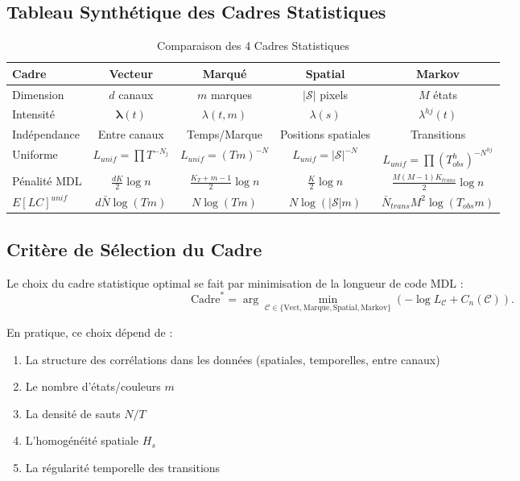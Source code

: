 \documentclass[11pt,a4paper]{article}
\begin{document}
	\subsection{Tableau Synthétique des Cadres Statistiques}
	\label{subsec:tableau_synthese}
	
	\begin{table}[h]
		\centering
		\caption{Comparaison des 4 Cadres Statistiques}
		\label{tab:cadres_stats}
		\begin{tabular}{|l|c|c|c|c|}
			\hline
			\textbf{Cadre} & \textbf{Vecteur} & \textbf{Marqué} & \textbf{Spatial} & \textbf{Markov} \\
			\hline
			Dimension & $d$ canaux & $m$ marques & $|\mathcal{S}|$ pixels & $M$ états \\
			\hline
			Intensité & $\boldsymbol{\lambda}(t)$ & $\lambda(t,m)$ & $\lambda(s)$ & $\lambda^{hj}(t)$ \\
			\hline
			Indépendance & Entre canaux & Temps/Marque & Positions spatiales & Transitions \\
			\hline
			Uniforme & $L_{unif} = \prod T^{-N_j}$ & $L_{unif} = (Tm)^{-N}$ & $L_{unif} = |\mathcal{S}|^{-N}$ & $L_{unif} = \prod (T_{obs}^h)^{-N^{hj}}$ \\
			\hline
			Pénalité MDL & $\frac{dK}{2}\log n$ & $\frac{K_T+m-1}{2}\log n$ & $\frac{K}{2}\log n$ & $\frac{M(M-1)K_{trans}}{2}\log n$ \\
			\hline
			$E[LC]^{unif}$ & $d\bar{N}\log(Tm)$ & $N\log(Tm)$ & $N\log(|\mathcal{S}|m)$ & $\bar{N}_{trans}M^2\log(T_{obs}m)$ \\
			\hline
		\end{tabular}
	\end{table}
	
	\subsection{Critère de Sélection du Cadre}
	\label{subsec:critere_selection}
	
	Le choix du cadre statistique optimal se fait par minimisation de la longueur de code MDL :
	\begin{equation}
		\text{Cadre}^* = \arg \min_{\mathcal{C} \in \{\text{Vect}, \text{Marque}, \text{Spatial}, \text{Markov}\}} \left( -\log L_{\mathcal{C}} + C_n(\mathcal{C}) \right).
	\end{equation}
	
	En pratique, ce choix dépend de :
	\begin{enumerate}
		\item La structure des corrélations dans les données (spatiales, temporelles, entre canaux)
		\item Le nombre d'états/couleurs $m$
		\item La densité de sauts $N/T$
		\item L'homogénéité spatiale $H_s$
		\item La régularité temporelle des transitions
	\end{enumerate}
	
\end{document}
